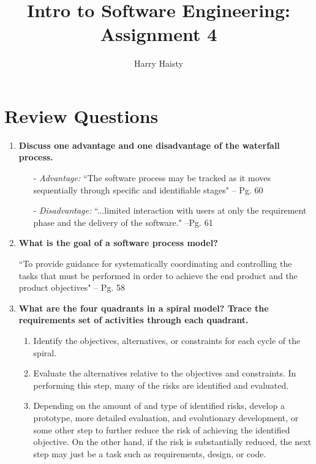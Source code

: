 \documentclass[11pt]{article}
\title{Intro to Software Engineering: Assignment 4}
\author{Harry Haisty}
\begin{document}
\maketitle
\section*{Review Questions}
\begin{enumerate}
    \item \textbf{Discuss one advantage and one disadvantage of the waterfall process.}

    \begin{itemize}
        \item[-] \textit{Advantage:} ``The software process may be tracked as it moves sequentially through specific and identifiable stages" -- Pg. 60
        \item[-] \textit{Disadvantage:} ``...limited interaction with users at only the requirement phase and the delivery of the software." --Pg. 61
    \end{itemize}
    
    \item \textbf{What is the goal of a software process model?}
 
    \newline
    ``To provide guidance for systematically coordinating and controlling the tasks that must be performed in order to achieve the end product and the product objectives" -- Pg. 58
    
    \item \textbf{What are the four quadrants in a spiral model? Trace the requirements set of activities through each quadrant.}

    \begin{enumerate}
        \item Identify the objectives, alternatives, or constraints for each cycle of the spiral.
        
        \item Evaluate the alternatives relative to the objectives and constraints. In performing this step, many of the risks are identified and evaluated. 
        
        \item Depending on the amount of and type of identified risks, develop a prototype, more detailed evaluation, and evolutionary development, or some other step to further reduce the risk of achieving the identified objective. On the other hand, if the risk is substantially reduced, the next step may just be a task such as requirements, design, or code. 
        

\end{enumerate}
\end{enumerate}
\end{document}
